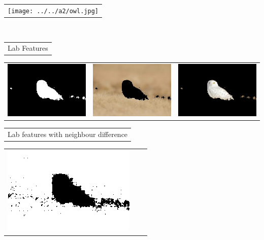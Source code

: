 \documentclass{article}
\begin{document}
\begin{center}
\begin{tabular}{c}
\texttt{[image: ../../a2/owl.jpg]}
\end{tabular}
\\
\begin{tabular}{c}

Lab Features \\
\end{tabular}
 \begin{tabular}{c c c} 

 \includegraphics[width=.37\linewidth]{../image-segmentation/output/Lab/owl_mask.jpg} & 
 
 \includegraphics[width=.37\linewidth]{../image-segmentation/output/Lab/owl_seg1.jpg} & \includegraphics[width=.37\linewidth]{../image-segmentation/output/Lab/owl_seg2.jpg} \\
  
 \end{tabular}
 \begin{tabular}{c}

Lab features with neighbour difference \\
\end{tabular}
 \begin{tabular}{c c c} 

 \includegraphics[width=.37\linewidth]{../image-segmentation/output/add-Lab-neighbor-diff-feature/owl_mask.jpg} & 
 

\end{tabular}
\end{center}
\end{document}
